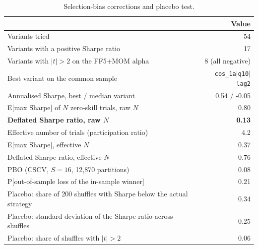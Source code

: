 \begin{table}[htbp]\centering\small
\caption{Selection-bias corrections and placebo test.}\label{tab:overfitting}
\begin{tabular}{lr}\toprule
 & Value \\ \midrule
Variants tried & 54 \\
Variants with a positive Sharpe ratio & 17 \\
Variants with $|t| > 2$ on the FF5+MOM alpha & 8 (all negative) \\
Best variant on the common sample & \texttt{cos\_1a$\mid$q10$\mid$lag2} \\
Annualised Sharpe, best / median variant & 0.54 / -0.05 \\
E[max Sharpe] of $N$ zero-skill trials, raw $N$ & 0.80 \\
\textbf{Deflated Sharpe ratio, raw $N$} & \textbf{0.13} \\
Effective number of trials (participation ratio) & 4.2 \\
E[max Sharpe], effective $N$ & 0.37 \\
Deflated Sharpe ratio, effective $N$ & 0.76 \\
PBO (CSCV, $S=16$, 12,870 partitions) & 0.08 \\
P[out-of-sample loss of the in-sample winner] & 0.21 \\
Placebo: share of 200 shuffles with Sharpe below the actual strategy & 0.34 \\
Placebo: standard deviation of the Sharpe ratio across shuffles & 0.25 \\
Placebo: share of shuffles with $|t| > 2$ & 0.06 \\
\bottomrule\end{tabular}\end{table}

